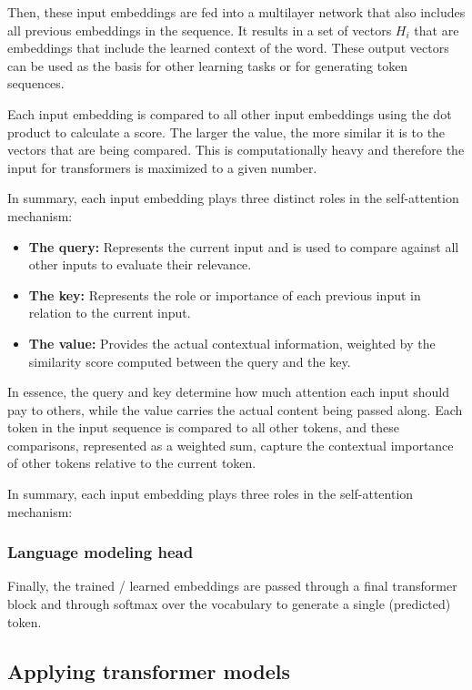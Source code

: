 Then, these input embeddings are fed into a multilayer network that
also includes all
previous embeddings in the sequence. It results in a set of vectors
$H_i$ that are embeddings
that include the learned context of the word. These output vectors
can be used as the basis for
other learning tasks or for generating token sequences.

Each input embedding is compared to all other input embeddings using
the dot product to calculate
a score. The larger the value, the more similar it is to the vectors
that are being compared. This
is computationally heavy and therefore the input for transformers is
maximized to a given number.

In summary, each input embedding plays three distinct roles in the
self-attention mechanism:

\begin{itemize}
  \item \textbf{The query:} Represents the current input and is used
    to compare against all other inputs to evaluate their relevance.
  \item \textbf{The key:} Represents the role or importance of each
    previous input in relation to the current input.
  \item \textbf{The value:} Provides the actual contextual
    information, weighted by the similarity score computed between
    the query and the key.
\end{itemize}

In essence, the query and key determine how much attention each input
should pay to others, while the value carries the actual content
being passed along. Each token in the input sequence is compared to
all other tokens, and these comparisons, represented as a weighted
sum, capture the contextual importance of other tokens relative to
the current token.

In summary, each input embedding plays three roles in the
self-attention mechanism:

\subsubsection{Language modeling head}

Finally, the trained / learned embeddings are passed through a final
transformer block and through
softmax over the vocabulary to generate a single (predicted) token.

\subsection{Applying transformer models}

